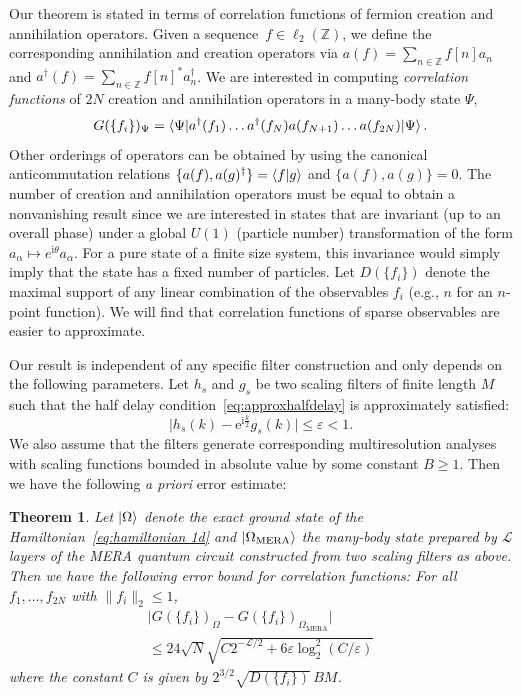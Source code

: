 \documentclass[aps,pra,reprint,superscriptaddress,floatfix,amsmath,amssymb,amsfonts]{revtex4-1}
\newtheorem{thm}{Theorem}\crefname{thm}{Theorem}{Theorems}
\newcommand*{\Z}{\mathbb Z}
\newcommand*{\rmi}{\mathrm{i}}
\newcommand*{\rme}{\mathrm{e}}
\begin{document}
Our theorem is stated in terms of correlation functions of fermion creation and annihilation operators.
Given a sequence~$f \in \ell_2(\Z)$, we define the corresponding annihilation and creation operators via $a(f) = \sum_{n\in\Z} f[n] a_n$ and $a^\dagger(f) = \sum_{n\in\Z} f[n]^* a^\dagger_n$.
We are interested in computing \emph{correlation functions} of $2N$ creation and annihilation operators in a many-body state $\Psi$,
\[
G(\{f_i\})_\Psi = \braket{\Psi | a^\dagger(f_1) \ldots a^\dagger(f_N) a(f_{N+1}) \ldots a(f_{2N}) | \Psi}.
\]
Other orderings of operators can be obtained by using the canonical anticommutation relations $\{ a(f), a(g)^\dagger \}=\braket{f|g}$ and $\{a(f),a(g)\}=0$.
The number of creation and annihilation operators must be equal to obtain a nonvanishing result since we are interested in states that are invariant (up to an overall phase) under a global $U(1)$ (particle number) transformation of the form $a_\alpha \mapsto e^{\mathrm{i} \theta} a_\alpha$. For a pure state of a finite size system, this invariance would simply imply that the state has a fixed number of particles. Let $D(\{f_i\})$ denote the maximal support of any linear combination of the observables $f_i$ (e.g., $n$ for an $n$-point function).
We will find that correlation functions of sparse observables are easier to approximate.

Our result is independent of any specific filter construction and only depends on the following parameters.
Let $h_s$ and $g_s$ be two scaling filters of finite length $M$ such that the half delay condition~\eqref{eq:approxhalfdelay} is approximately satisfied:
\begin{equation}\label{eq:approxhalfdelay quantitative}
  \lvert h_s(k) - \rme^{\rmi \frac k2} g_s(k) \rvert \leq \varepsilon < 1.
\end{equation}
We also assume that the filters generate corresponding multiresolution analyses with scaling functions bounded in absolute value by some constant $B\geq1$.
Then we have the following \emph{a priori} error estimate:

\begin{thm}\label{thm:main}
Let $\ket\Omega$ denote the exact ground state of the Hamiltonian~\eqref{eq:hamiltonian 1d} and $\ket{\Omega_\text{MERA}}$ the many-body state prepared by $\mathcal L$ layers of the MERA quantum circuit constructed from two scaling filters as above.
Then we have the following error bound for correlation functions:
For all $f_1,\dots,f_{2N}$ with $\lVert f_i\rVert_2 \leq 1$,
\begin{gather*}
  \bigl\lvert G(\{f_i\})_\Omega - G(\{f_i\})_{\Omega_{\text{MERA}}}\bigr\rvert \\
  \leq 24 \sqrt{N} \sqrt{C 2^{-\mathcal L/2} + 6 \varepsilon \log_2^2(C/\varepsilon)}
\end{gather*}
where the constant $C$ is given by $2^{3/2} \sqrt{D(\{f_i\})} \, B M$.
\end{thm}
\end{document}
